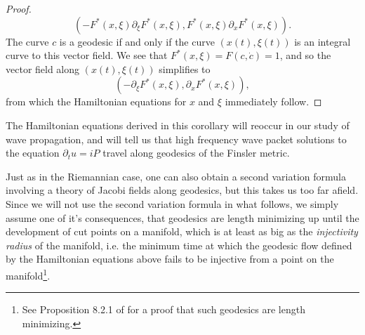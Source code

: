 \begin{proof}
  \begin{equation}
    ( - F^*(x,\xi) \partial_\xi F^*(x,\xi), F^*(x,\xi) \partial_x F^*(x,\xi) ).
  \end{equation}
  The curve $c$ is a geodesic if and only if the curve $(x(t), \xi(t))$ is an integral curve to this vector field. We see that $F^*(x,\xi) = F(c,\dot{c}) = 1$, and so the vector field along $(x(t),\xi(t))$ simplifies to
  \begin{equation}
    ( - \partial_\xi F^*(x,\xi), \partial_x F^*(x,\xi) ), 
  \end{equation}
  from which the Hamiltonian equations for $x$ and $\xi$ immediately follow.
\end{proof}

\begin{remark}
  The Hamiltonian equations derived in this corollary will reoccur in our study of wave propagation, and will tell us that high frequency wave packet solutions to the equation $\partial_t u = i P$ travel along geodesics of the Finsler metric.
\end{remark}

Just as in the Riemannian case, one can also obtain a second variation formula involving a theory of Jacobi fields along geodesics, but this takes us too far afield. Since we will not use the second variation formula in what follows, we simply assume one of it's consequences, that geodesics are length minimizing up until the development of cut points on a manifold, which is at least as big as the \emph{injectivity radius} of the manifold, i.e. the minimum time at which the geodesic flow defined by the Hamiltonian equations above fails to be injective from a point on the manifold\footnote{See Proposition 8.2.1 of \cite{BaoChern} for a proof that such geodesics are length minimizing.}.


